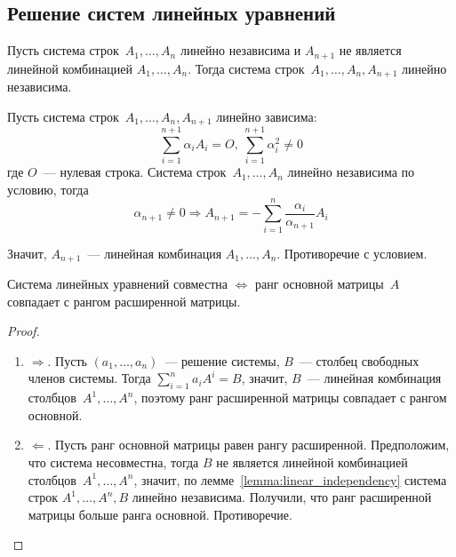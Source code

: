 \subsection{Решение систем линейных уравнений}
\begin{lemma}
\label{lemma:linear_independency}
Пусть система строк~$A_1, \ldots, A_n$ линейно независима и $A_{n+1}$ не является линейной комбинацией $A_1, \ldots, A_n$. Тогда система строк~$A_1, \ldots, A_n, A_{n+1}$ линейно независима.
\end{lemma}
\begin{proofcontra}
Пусть система строк~$A_1, \ldots, A_n, A_{n+1}$ линейно зависима:
\begin{equation*}
\sum_{i=1}^{n+1} \alpha_i A_i = O, \ 
\sum_{i=1}^{n+1} \alpha_i^2 \neq 0
\end{equation*}
где $O$~--- нулевая строка.
Система строк~$A_1, \ldots, A_n$ линейно независима по условию, тогда
\begin{equation*}
\alpha_{n+1} \neq 0 \Rightarrow A_{n+1} = -\sum_{i=1}^n \frac{\alpha_i}{\alpha_{n+1}} A_i
\end{equation*}

Значит, $A_{n+1}$~--- линейная комбинация $A_1, \ldots, A_n$.
Противоречие с условием.
\end{proofcontra}

\begin{theorem}
Система линейных уравнений совместна $\Leftrightarrow$ ранг основной матрицы~$A$ совпадает с рангом расширенной матрицы.
\end{theorem}
\begin{proof}
\begin{enumerate}
	\item $\Rightarrow$. Пусть $(a_1, \ldots, a_n)$~--- решение системы, $B$~--- столбец свободных членов системы.
	Тогда $\displaystyle \sum_{i=1}^n a_i A^i = B$, значит, $B$~--- линейная комбинация столбцов~$A^1, \ldots, A^n$, поэтому ранг расширенной матрицы совпадает с рангом основной.
	
	\item $\Leftarrow$. Пусть ранг основной матрицы равен рангу расширенной.
	Предположим, что система несовместна, тогда $B$ не является линейной комбинацией столбцов~$A^1, \ldots, A^n$, значит, по лемме~\ref*{lemma:linear_independency} система строк $A^1, \ldots, A^n, B$ линейно независима.
	Получили, что ранг расширенной матрицы больше ранга основной.
	Противоречие.
\end{enumerate}
\end{proof}

